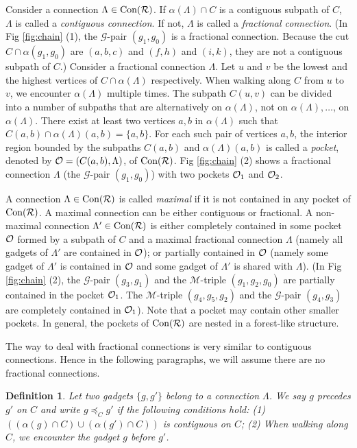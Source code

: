 \documentclass[11pt]{article}
\newcommand{\R}{{\cal R}}
\newcommand{\OO}{{\cal O}}
\newcommand{\MM}{\mathcal{M}}
\newcommand{\GG}{\mathcal{G}}
\newcommand{\CON}{\mbox{Con}}
\newtheorem{definition}[figure]{Definition}
\begin{document}
Consider a connection $\Lambda\in \CON(\R)$. If $\alpha(\Lambda) \cap C$
is a contiguous subpath of $C$, $\Lambda$ is called a {\em contiguous
connection}. If not, $\Lambda$ is called a {\em fractional connection}.
(In Fig \ref{fig:chain} (1), the $\GG$-pair $(g_1,g_0)$ is a
fractional connection.
Because the cut $C \cap \alpha(g_1, g_0)$ are
$(a, b, c)$ and $(f, h)$ and $(i, k)$, they are not a contiguous subpath of $C$.)
Consider a fractional connection
$\Lambda$. Let $u$ and $v$ be the lowest and the highest vertices
of $C\cap \alpha(\Lambda)$ respectively. When walking along $C$
from $u$ to $v$, we encounter $\alpha(\Lambda)$ multiple times.
The subpath $C(u,v)$ can be divided into a number of subpaths that are
alternatively on $\alpha(\Lambda)$, not on $\alpha(\Lambda), \ldots$,
on $\alpha(\Lambda)$. There exist at least two vertices $a,b$ in
$\alpha(\Lambda)$ such that $C(a, b)\cap \alpha(\Lambda)(a, b)=\{a, b\}$.
For each such pair of vertices $a,b$, the interior region bounded by
the subpaths $C(a, b)$ and $\alpha(\Lambda)(a, b)$ is called a {\em pocket},
denoted by $\OO=(C(a, b), \Lambda)$, of $\CON(\R)$.
Fig \ref{fig:chain} (2) shows a fractional connection $\Lambda$ (the $\GG$-pair
$(g_1, g_0)$) with two pockets $\OO_1$ and $\OO_2$.

A connection $\Lambda\in \CON(\R)$ is called
\emph{maximal} if it is not contained in any pocket of $\CON(\R)$.
A maximal connection can be either contiguous or
fractional. A non-maximal connection $\Lambda'\in \CON(\R)$ is either
completely contained in some pocket $\OO$ formed by a subpath of $C$
and a maximal fractional connection $\Lambda$ (namely all gadgets
of $\Lambda'$ are contained in $\OO$); or partially contained in $\OO$
(namely some gadget of $\Lambda'$ is contained in $\OO$
and some gadget of $\Lambda'$ is shared with $\Lambda$).
(In Fig \ref{fig:chain} (2), the $\GG$-pair $(g_3,g_1)$ and the $\MM$-triple
$(g_1,g_2,g_0)$ are partially contained in the pocket $\OO_1$. The $\MM$-triple
$(g_4,g_5,g_2)$ and the $\GG$-pair $(g_4,g_3)$ are completely contained in
$\OO_1$). Note that a pocket may contain other smaller pockets. In general,
the pockets of $\CON(\R)$ are nested in a forest-like structure.

The way to deal with fractional connections is very similar to contiguous connections.
Hence in the following paragraphs, we will assume there are no fractional connections.

\begin{definition}\label{def:lessthan}
Let two gadgets $\{g, g'\}$ belong to a connection $\Lambda$.
We say $g$ { \em precedes} $g'$ on $C$ and write
$g\preceq_C g'$ if the following conditions hold:
(1) $((\alpha(g)\cap C) \cup (\alpha(g')\cap C))$ is contiguous on $C$;
(2) When walking along $C$, we encounter the gadget $g$
before $g'$.
\end{definition}
\end{document}
